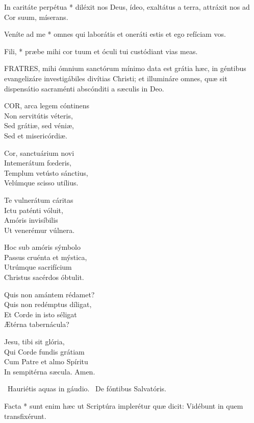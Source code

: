  In caritáte perpétua * diléxit nos Deus, ídeo, exaltátus a terra, attráxit nos ad Cor suum, míserans.

 Veníte ad me * omnes qui laborátis et oneráti estis et ego refíciam vos.

 Fili, * præbe mihi cor tuum et óculi tui custódiant vias meas.


\lettrine[lines=2]{F}{RATRES}, mihi ómnium sanctórum mínimo data est grátia hæc, in géntibus evangelizáre investigábiles divítias Christi; et illumináre omnes, quæ sit dispensátio sacraménti abscónditi a sæculis in Deo.


\lettrine[lines=2]{C}{OR}, arca legem cóntinens\\
Non servitútis véteris,\\
Sed grátiæ, sed véniæ,\\
Sed et misericórdiæ.

Cor, sanctuárium novi\\
Intemerátum fœderis,\\
Templum vetústo sánctius,\\
Velúmque scisso utílius.

Te vulnerátum cáritas\\
Ictu paténti vóluit,\\
Amóris invisíbilis\\
Ut venerémur vúlnera.

Hoc sub amóris sýmbolo\\
Passus cruénta et mýstica,\\
Utrúmque sacrifícium\\
Christus sacérdos óbtulit.

Quis non amántem rédamet?\\
Quis non redémptus díligat,\\
Et Corde in isto séligat\\
Ætérna tabernácula?

Jesu, tibi sit glória,\\
Qui Corde fundis grátiam\\
Cum Patre et almo Spíritu\\
In sempitérna sæcula. Amen.

\V\ Hauriétis aquas in gáudio. \R\ De fóntibus Salvatóris.

 Facta * sunt enim hæc ut Scriptúra implerétur quæ dicit: Vidébunt in quem transfixérunt.

